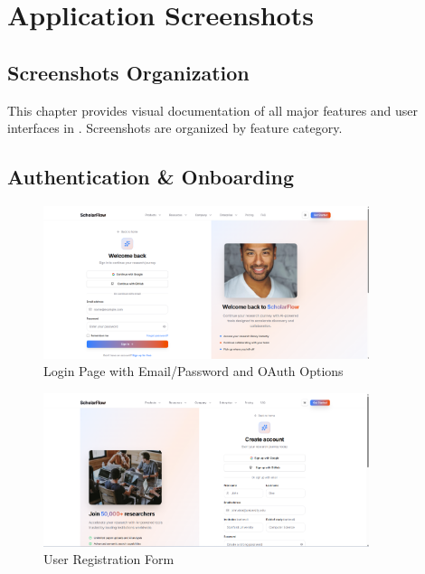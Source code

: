 \chapter{Application Screenshots}
\label{ch:screenshots}

\section{Screenshots Organization}
\label{sec:screenshots-organization}

This chapter provides visual documentation of all major features and user interfaces in \projectname{}. Screenshots are organized by feature category.

\section{Authentication \& Onboarding}
\label{sec:screenshots-auth}

\begin{figure}[H]
\centering
\includegraphics[width=0.85\textwidth]{images/screenshots/sign_in.png}
\caption{Login Page with Email/Password and OAuth Options}
\label{fig:screenshot-login}
\end{figure}

\begin{figure}[H]
\centering
\includegraphics[width=0.85\textwidth]{images/screenshots/sign_up.png}
\caption{User Registration Form}
\label{fig:screenshot-register}
\end{figure}

